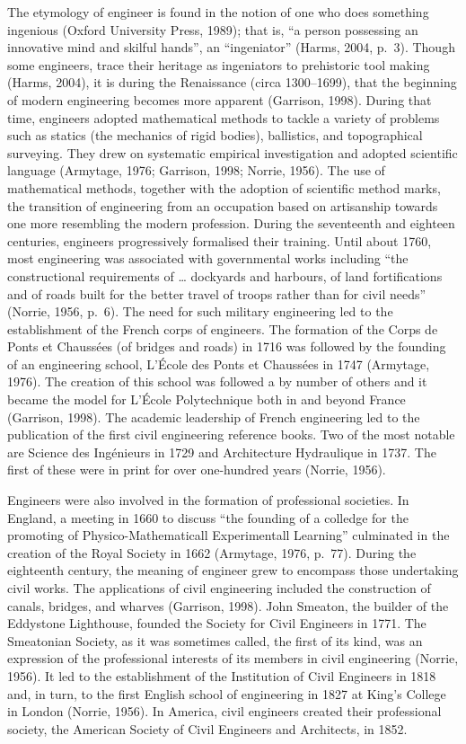 \documentclass[]{book}
\theoremstyle{definition}
\theoremstyle{definition}
\theoremstyle{definition}
\theoremstyle{remark}
\begin{document}
The etymology of engineer is found in the notion of one who does
something ingenious (Oxford University Press, 1989); that is, ``a person
possessing an innovative mind and skilful hands'', an ``ingeniator''
(Harms, 2004, p.~3). Though some engineers, trace their heritage as
ingeniators to prehistoric tool making (Harms, 2004), it is during the
Renaissance (circa 1300--1699), that the beginning of modern engineering
becomes more apparent (Garrison, 1998). During that time, engineers
adopted mathematical methods to tackle a variety of problems such as
statics (the mechanics of rigid bodies), ballistics, and topographical
surveying. They drew on systematic empirical investigation and adopted
scientific language (Armytage, 1976; Garrison, 1998; Norrie, 1956). The
use of mathematical methods, together with the adoption of scientific
method marks, the transition of engineering from an occupation based on
artisanship towards one more resembling the modern profession. During
the seventeenth and eighteen centuries, engineers progressively
formalised their training. Until about 1760, most engineering was
associated with governmental works including ``the constructional
requirements of \ldots{} dockyards and harbours, of land fortifications
and of roads built for the better travel of troops rather than for civil
needs'' (Norrie, 1956, p.~6). The need for such military engineering led
to the establishment of the French corps of engineers. The formation of
the Corps de Ponts et Chaussées (of bridges and roads) in 1716 was
followed by the founding of an engineering school, L'École des Ponts et
Chaussées in 1747 (Armytage, 1976). The creation of this school was
followed a by number of others and it became the model for L'École
Polytechnique both in and beyond France (Garrison, 1998). The academic
leadership of French engineering led to the publication of the first
civil engineering reference books. Two of the most notable are Science
des Ingénieurs in 1729 and Architecture Hydraulique in 1737. The first
of these were in print for over one-hundred years (Norrie, 1956).

Engineers were also involved in the formation of professional societies.
In England, a meeting in 1660 to discuss ``the founding of a colledge
for the promoting of Physico-Mathematicall Experimentall Learning''
culminated in the creation of the Royal Society in 1662 (Armytage, 1976,
p.~77). During the eighteenth century, the meaning of engineer grew to
encompass those undertaking civil works. The applications of civil
engineering included the construction of canals, bridges, and wharves
(Garrison, 1998). John Smeaton, the builder of the Eddystone Lighthouse,
founded the Society for Civil Engineers in 1771. The Smeatonian Society,
as it was sometimes called, the first of its kind, was an expression of
the professional interests of its members in civil engineering (Norrie,
1956). It led to the establishment of the Institution of Civil Engineers
in 1818 and, in turn, to the first English school of engineering in 1827
at King's College in London (Norrie, 1956). In America, civil engineers
created their professional society, the American Society of Civil
Engineers and Architects, in 1852.
\end{document}
